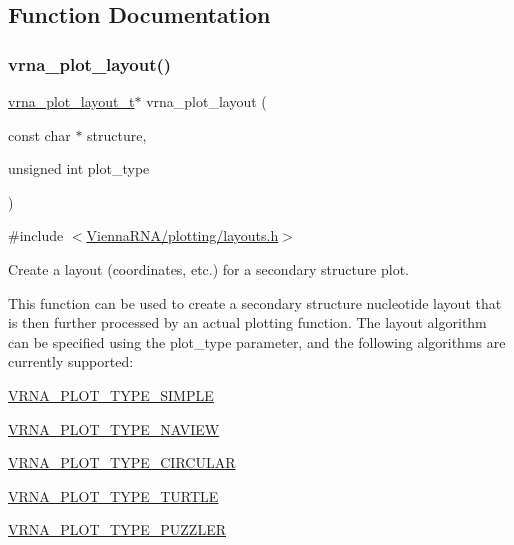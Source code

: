 \subsection{Function Documentation}
\mbox{\label{group__plot__layout__utils_ga7953b759eada86c61b0a4aebe0dc67d1}} 
\subsubsection{\texorpdfstring{vrna\_plot\_layout()}{vrna\_plot\_layout()}}
{\footnotesize\ttfamily \mbox{\hyperlink{group__plot__layout__utils_gac986fe092abc2a6a93ceb5141e4dd28b}{vrna\+\_\+plot\+\_\+layout\+\_\+t}}$\ast$ vrna\+\_\+plot\+\_\+layout (\begin{DoxyParamCaption}\item[{const char $\ast$}]{structure,  }\item[{unsigned int}]{plot\+\_\+type }\end{DoxyParamCaption})}



{\ttfamily \#include $<$\mbox{\hyperlink{layouts_8h}{Vienna\+R\+N\+A/plotting/layouts.\+h}}$>$}



Create a layout (coordinates, etc.) for a secondary structure plot. 

This function can be used to create a secondary structure nucleotide layout that is then further processed by an actual plotting function. The layout algorithm can be specified using the {\ttfamily plot\+\_\+type} parameter, and the following algorithms are currently supported\+:
\begin{DoxyItemize}
\item \mbox{\hyperlink{group__plot__layout__utils_gae6d17b9f0a53cf5205a9181e0f8422e9}{V\+R\+N\+A\+\_\+\+P\+L\+O\+T\+\_\+\+T\+Y\+P\+E\+\_\+\+S\+I\+M\+P\+LE}}
\item \mbox{\hyperlink{group__plot__layout__utils_ga94d4c863ecac2f220f76658afb92f964}{V\+R\+N\+A\+\_\+\+P\+L\+O\+T\+\_\+\+T\+Y\+P\+E\+\_\+\+N\+A\+V\+I\+EW}}
\item \mbox{\hyperlink{group__plot__layout__utils_ga8c9eac631348da92136c8363ecdd9fb9}{V\+R\+N\+A\+\_\+\+P\+L\+O\+T\+\_\+\+T\+Y\+P\+E\+\_\+\+C\+I\+R\+C\+U\+L\+AR}}
\item \mbox{\hyperlink{group__plot__layout__utils_ga382c1c5c0b1943500aa4bb55b7658a33}{V\+R\+N\+A\+\_\+\+P\+L\+O\+T\+\_\+\+T\+Y\+P\+E\+\_\+\+T\+U\+R\+T\+LE}}
\item \mbox{\hyperlink{group__plot__layout__utils_ga64ec68055e241d11f659edb50f27ecae}{V\+R\+N\+A\+\_\+\+P\+L\+O\+T\+\_\+\+T\+Y\+P\+E\+\_\+\+P\+U\+Z\+Z\+L\+ER}}
\end{DoxyItemize}

